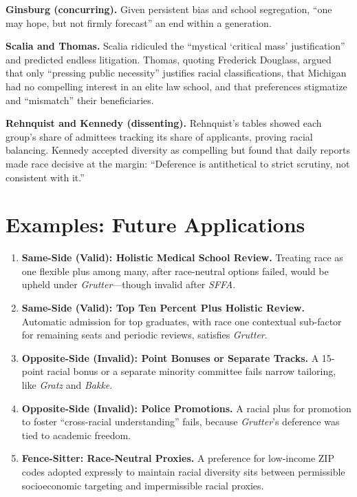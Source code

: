 \documentclass[12pt]{article}
\begin{document}
\textbf{Ginsburg (concurring).} Given persistent bias and school segregation, ``one may hope, but not firmly forecast'' an end within a generation.

\textbf{Scalia and Thomas.} Scalia ridiculed the ``mystical `critical mass' justification'' and predicted endless litigation. Thomas, quoting Frederick Douglass, argued that only ``pressing public necessity'' justifies racial classifications, that Michigan had no compelling interest in an elite law school, and that preferences stigmatize and ``mismatch'' their beneficiaries.

\textbf{Rehnquist and Kennedy (dissenting).} Rehnquist's tables showed each group's share of admittees tracking its share of applicants, proving racial balancing. Kennedy accepted diversity as compelling but found that daily reports made race decisive at the margin: ``Deference is antithetical to strict scrutiny, not consistent with it.''

\section{Examples: Future Applications}

\begin{enumerate}
\item \textbf{Same-Side (Valid): Holistic Medical School Review.} Treating race as one flexible plus among many, after race-neutral options failed, would be upheld under \textit{Grutter}---though invalid after \textit{SFFA}.
\item \textbf{Same-Side (Valid): Top Ten Percent Plus Holistic Review.} Automatic admission for top graduates, with race one contextual sub-factor for remaining seats and periodic reviews, satisfies \textit{Grutter}.
\item \textbf{Opposite-Side (Invalid): Point Bonuses or Separate Tracks.} A 15-point racial bonus or a separate minority committee fails narrow tailoring, like \textit{Gratz} and \textit{Bakke}.
\item \textbf{Opposite-Side (Invalid): Police Promotions.} A racial plus for promotion to foster ``cross-racial understanding'' fails, because \textit{Grutter}'s deference was tied to academic freedom.
\item \textbf{Fence-Sitter: Race-Neutral Proxies.} A preference for low-income ZIP codes adopted expressly to maintain racial diversity sits between permissible socioeconomic targeting and impermissible racial proxies.
\end{enumerate}
\end{document}
